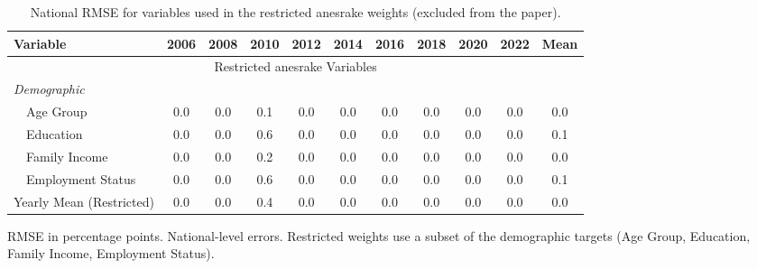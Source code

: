 \begin{table}[!htbp]
\centering
\footnotesize
\caption{National RMSE for variables used in the restricted anesrake weights (excluded from the paper).}
\label{tab:national_anesrake_restricted_accuracy}
\begin{tabular}{lcccccccccc}
\toprule
Variable & 2006 & 2008 & 2010 & 2012 & 2014 & 2016 & 2018 & 2020 & 2022 & Mean \\
\midrule
\multicolumn{11}{c}{Restricted anesrake Variables} \\
\midrule
\multicolumn{11}{l}{\textit{Demographic}} \\
\addlinespace[0.2em]
~~Age Group & 0.0 & 0.0 & 0.1 & 0.0 & 0.0 & 0.0 & 0.0 & 0.0 & 0.0 & 0.0 \\
~~Education & 0.0 & 0.0 & 0.6 & 0.0 & 0.0 & 0.0 & 0.0 & 0.0 & 0.0 & 0.1 \\
~~Family Income & 0.0 & 0.0 & 0.2 & 0.0 & 0.0 & 0.0 & 0.0 & 0.0 & 0.0 & 0.0 \\
~~Employment Status & 0.0 & 0.0 & 0.6 & 0.0 & 0.0 & 0.0 & 0.0 & 0.0 & 0.0 & 0.1 \\
\midrule
Yearly Mean (Restricted) & 0.0 & 0.0 & 0.4 & 0.0 & 0.0 & 0.0 & 0.0 & 0.0 & 0.0 & 0.0 \\
\bottomrule
\end{tabular}
\par\smallskip\footnotesize RMSE in percentage points. National-level errors. Restricted weights use a subset of the demographic targets (Age Group, Education, Family Income, Employment Status).
\end{table}
